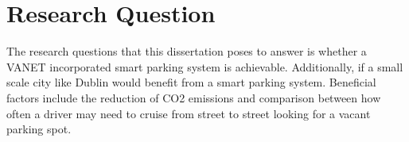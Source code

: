 \section{Research Question}
The research questions that this dissertation poses to answer is whether a VANET incorporated smart parking system is achievable. Additionally, if a small scale city like Dublin would benefit from a smart parking system. Beneficial factors include the reduction of CO2 emissions and comparison between how often a driver may need to cruise from street to street looking for a vacant parking spot.